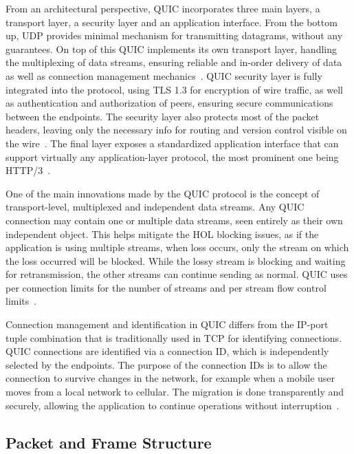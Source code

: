 \documentclass[english, 12pt, a4paper, elec, utf8, a-2b, online]{aaltothesis}
\begin{document}
From an architectural perspective, QUIC incorporates three main layers, a transport
layer, a security layer and an application interface. From the bottom up, UDP provides
minimal mechanism for transmitting datagrams, without any guarantees. On top of this
QUIC implements its own transport layer, handling the multiplexing of data streams,
ensuring reliable and in-order delivery of data as well as connection management
mechanics~\cite{rfc9000}. QUIC security layer is fully integrated into the protocol, using TLS 1.3
for encryption of wire traffic, as well as authentication and authorization of peers, ensuring
secure communications between the endpoints. The security layer also protects most of
the packet headers, leaving only the necessary info for routing and version control
visible on the wire~\cite{rfc9001}. The final layer exposes a standardized application
interface that can support virtually any application-layer protocol, the most prominent
one being HTTP/3~\cite{rfc9113}.

One of the main innovations made by the QUIC protocol is the concept of transport-level,
multiplexed and independent data streams. Any QUIC connection may contain one or multiple
data streams, seen entirely as their own independent object. This helps mitigate the
HOL blocking issues, as if the application is using multiple streams, when loss occurs,
only the stream on which the loss occurred will be blocked. While the lossy stream is
blocking and waiting for retransmission, the other streams can continue sending as 
normal. QUIC uses per connection limits for the number of streams and per stream
flow control limits~\cite{rfc9000}.

Connection management and identification in QUIC differs from the IP-port tuple
combination that is traditionally used in TCP for identifying connections. QUIC connections are identified via a
connection ID, which is independently selected by the endpoints. The purpose of the
connection IDs is to allow the connection to survive changes in the network, for example
when a mobile user moves from a local network to cellular. The migration is done transparently
and securely, allowing the application to continue operations without interruption~\cite{rfc9000}.

\subsection{Packet and Frame Structure}
\end{document}
